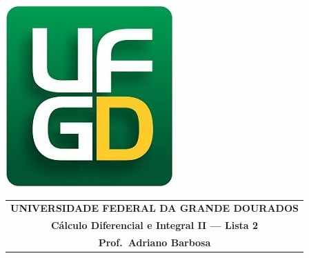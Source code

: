 \documentclass[a4paper,5pt]{amsbook}
\begin{document}
\thispagestyle{empty}
\pagestyle{empty}
\begin{minipage}[h]{0.14\textwidth}
    \includegraphics[scale=0.24]{../../ufgd.png}
\end{minipage}
\begin{minipage}[h]{\textwidth}
    \begin{tabular}{c}
        {{\bf UNIVERSIDADE FEDERAL DA GRANDE DOURADOS}}\\
        {{\bf C\'{a}lculo Diferencial e Integral II --- Lista 2}}\\
        {{\bf Prof.\ Adriano Barbosa}}\\
    \end{tabular}
    \vspace{-0.45cm}
\end{minipage}

\end{document}
